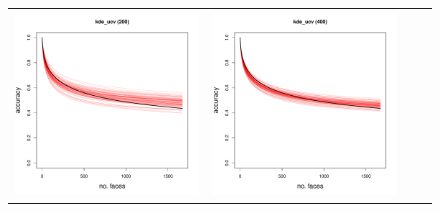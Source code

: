 \documentclass[twoside,11pt]{article}
\begin{document}
\begin{figure}
\begin{tabular}{cccc}
\includegraphics[scale = 0.2, clip = true, trim = 0 0 0 0.6in, valign=c]{repeat_200_kde_ucv.pdf} &
\includegraphics[scale = 0.2, clip = true, trim = 0 0 0 0.6in, valign=c]{repeat_400_kde_ucv.pdf} \\

\end{tabular}
\end{figure}
\end{document}
